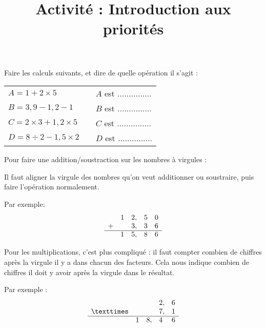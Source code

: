 \documentclass[a4paper]{article}
\title{Activité : Introduction aux priorités}
\author{}
\date{}
\begin{document}
\maketitle

\begin{exercice*}
	Faire les calculs suivants, et dire de quelle opération il s'agit : \\[0.5em]

	\begin{tabular}{lcl}
		$A = 1 + 2 × 5$       & \phantom{space} & $A$ est ............... \\[3.5em]
		$B = 3,9 - 1,2 - 1$   & \phantom{space} & $B$ est ............... \\[3.5em]
		$C = 2 × 3 + 1,2 × 5$ & \phantom{space} & $C$ est ............... \\[3.5em]
		$D = 8 ÷ 2 - 1,5 × 2$ & \phantom{space} & $D$ est ............... \\[3.5em]
	\end{tabular}
\end{exercice*}

\begin{greybox}[frametitle={RAPPEL : Opérations sur les nombres à virgule}]
	Pour faire une addition/soustraction sur les nombres à virgules :

	Il faut aligner la virgule des nombres qu'on veut additionner ou soustraire, puis faire l'opération normalement.

	Par exemple:
	\renewcommand{\arraystretch}{1.5}
	$$\begin{array}{lllll}
			  & 1 & 2  , & 5 & 0 \\
			+ &   & 3  , & 3 & 6 \\ \cline{0-4}
			  & 1 & 5  , & 8 & 6
		\end{array}$$
	\renewcommand{\arraystretch}{1}

	Pour les multiplications, c'est plus compliqué : il faut compter combien de chiffres après la virgule il y a dans chacun des facteurs. Cela nous indique combien de chiffres il doit y avoir après la virgule dans le résultat.

	Par exemple :
	\renewcommand{\arraystretch}{1.5}
	$$\begin{array}{lllll}
			  &   &      & 2  , & 6 \\
			× &   &      & 7  , & 1 \\ \cline{0-4}
			  & 1 & 8  , & 4    & 6
		\end{array}$$
	\renewcommand{\arraystretch}{1}
\end{greybox}
\end{document}

